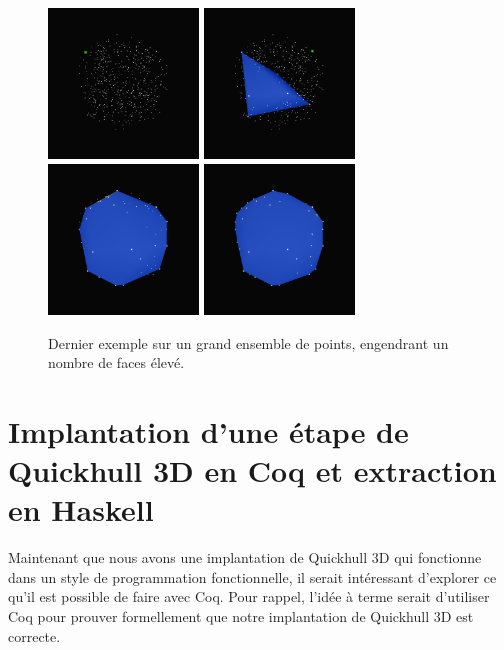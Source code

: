 \documentclass[]{article}
\begin{document}
\begin{figure}[H]
	\begin{center}
		\includegraphics[width=4cm]{qh3d/demo3d/main_0.png}
		\includegraphics[width=4cm]{qh3d/demo3d/main_1.png}
		\includegraphics[width=4cm]{qh3d/demo3d/main_2.png}
		\includegraphics[width=4cm]{qh3d/demo3d/main_3.png}
	\end{center}
	\caption{Dernier exemple sur un grand ensemble de points, engendrant un nombre de faces élevé.}
\end{figure}

\section{Implantation d'une étape de Quickhull 3D en Coq et extraction en Haskell}
Maintenant que nous avons une implantation de Quickhull 3D qui fonctionne dans un style de programmation fonctionnelle, il serait intéressant d'explorer ce qu'il est possible de faire avec Coq. Pour rappel, l'idée à terme serait d'utiliser Coq pour prouver formellement que notre implantation de Quickhull 3D est correcte.
\end{document}
